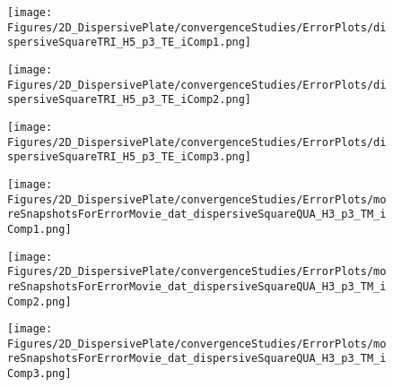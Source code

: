 \begin{figure}
\texttt{[image: Figures/2D\_DispersivePlate/convergenceStudies/ErrorPlots/dispersiveSquareTRI\_H5\_p3\_TE\_iComp1.png]}
\end{figure}

\begin{figure}
\texttt{[image: Figures/2D\_DispersivePlate/convergenceStudies/ErrorPlots/dispersiveSquareTRI\_H5\_p3\_TE\_iComp2.png]}
\end{figure}

\begin{figure}
\texttt{[image: Figures/2D\_DispersivePlate/convergenceStudies/ErrorPlots/dispersiveSquareTRI\_H5\_p3\_TE\_iComp3.png]}
\end{figure}

\begin{figure}
\texttt{[image: Figures/2D\_DispersivePlate/convergenceStudies/ErrorPlots/moreSnapshotsForErrorMovie\_dat\_dispersiveSquareQUA\_H3\_p3\_TM\_iComp1.png]}
\end{figure}

\begin{figure}
\texttt{[image: Figures/2D\_DispersivePlate/convergenceStudies/ErrorPlots/moreSnapshotsForErrorMovie\_dat\_dispersiveSquareQUA\_H3\_p3\_TM\_iComp2.png]}
\end{figure}

\begin{figure}
\texttt{[image: Figures/2D\_DispersivePlate/convergenceStudies/ErrorPlots/moreSnapshotsForErrorMovie\_dat\_dispersiveSquareQUA\_H3\_p3\_TM\_iComp3.png]}
\end{figure}
